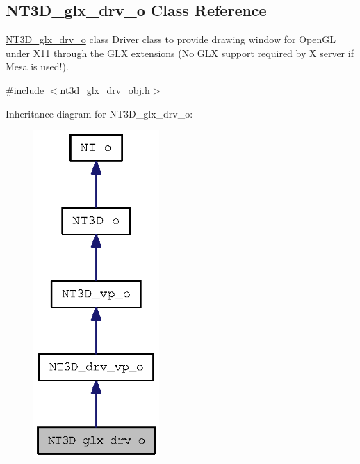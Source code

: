 \subsection{NT3D\_\-glx\_\-drv\_\-o Class Reference}
\label{class_n_t3_d__glx__drv__o}


\hyperlink{class_n_t3_d__glx__drv__o}{NT3D\_\-glx\_\-drv\_\-o} class Driver class to provide drawing window for OpenGL under X11 through the GLX extensions (No GLX support required by X server if Mesa is used!).  




{\ttfamily \#include $<$nt3d\_\-glx\_\-drv\_\-obj.h$>$}



Inheritance diagram for NT3D\_\-glx\_\-drv\_\-o:
\nopagebreak
\begin{figure}[H]
\begin{center}
\leavevmode
\includegraphics[width=136pt]{class_n_t3_d__glx__drv__o__inherit__graph}
\end{center}
\end{figure}


